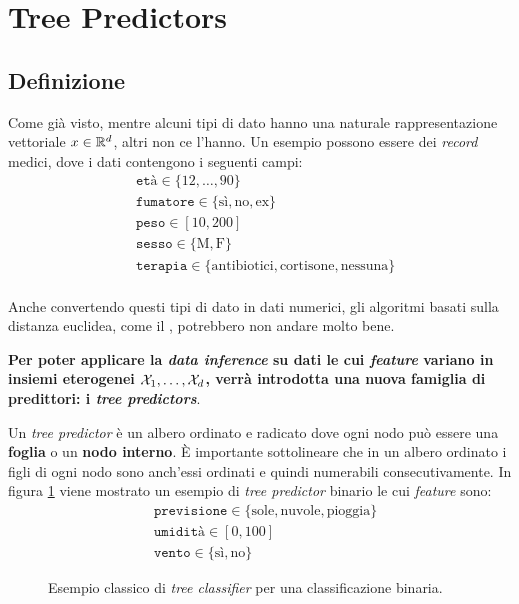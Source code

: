 \section{Tree Predictors}

\subsection{Definizione}
Come già visto, mentre alcuni tipi di dato hanno una naturale rappresentazione
vettoriale $x \in \mathbb{R}^d$, altri non ce l'hanno. Un esempio possono essere dei
\textit{record} medici, dove i dati contengono i seguenti campi:
$$ \begin{aligned}
    &\texttt{età} \in \{12,\dots,90\} \\
    &\texttt{fumatore} \in \{\text{sì},\text{no},\text{ex}\} \\
    &\texttt{peso} \in [10,200] \\
    &\texttt{sesso} \in \{\text{M},\text{F}\} \\
    &\texttt{terapia} \in \{\text{antibiotici},\text{cortisone},\text{nessuna}\} \\
\end{aligned} $$

Anche convertendo questi tipi di dato in dati numerici, gli algoritmi basati sulla
distanza euclidea, come il \kNN, potrebbero non andare molto bene.

\textbf{Per poter applicare la \textit{data inference} su dati le cui 
\textit{feature} variano in insiemi eterogenei $\mathcal{X}_1,\dots,\mathcal{X}_d$, verrà introdotta 
una nuova famiglia di predittori: i \textit{tree predictors}}.

Un \textit{tree predictor} è un albero ordinato e radicato dove ogni nodo può
essere una \textbf{foglia} o un \textbf{nodo interno}. È importante sottolineare che
in un albero ordinato i figli di ogni nodo sono anch'essi ordinati e quindi numerabili
consecutivamente.
In figura \ref{fig:tree_class}
viene mostrato un esempio di \textit{tree predictor} binario le cui \textit{feature}
sono:
$$ \begin{aligned}
    &\texttt{previsione} \in \{\text{sole},\text{nuvole},\text{pioggia}\} \\
    &\texttt{umidità} \in [0,100] \\
    &\texttt{vento} \in \{\text{sì},\text{no}\}
\end{aligned} $$
 
\begin{figure}[h]
    \centering
    
    \caption{Esempio classico di \textit{tree classifier} per una classificazione
    binaria.\label{fig:tree_class}}
\end{figure}

